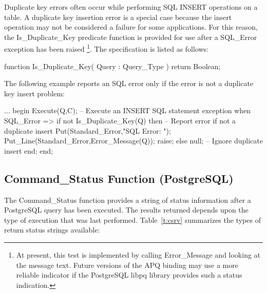 \documentclass[english,letterpaper]{book}
\begin{document}
Duplicate key errors often occur while performing SQL INSERT operations
on a table. A duplicate key insertion error is a special case because
the insert operation may not be considered a failure for some applications.
For this reason, the Is\_Duplicate\_Key predicate function is provided
for use after a SQL\_Error exception has been raised%
\footnote{At present, this test is implemented by calling Error\_Message and
looking at the message text. Future versions of the APQ binding may
use a more reliable indicator if the PostgreSQL libpq library provides
such a status indication.%
}. The specification is listed as follows:

\begin{Code}
function Is_Duplicate_Key(
   Query : Query_Type
) return Boolean;
\end{Code}

The following example reports an SQL error only if the error is not
a duplicate key insert problem:

\begin{Example}
...
begin
   Execute(Q,C);  -- Execute an INSERT SQL statement
exception
   when SQL_Error =>
      if not Is_Duplicate_Key(Q) then
         -- Report error if not a duplicate insert
         Put(Standard_Error,"SQL Error: ");
         Put_Line(Standard_Error,Error_Message(Q));
         raise;
      else
         null; -- Ignore duplicate insert
      end;
end;
\end{Example}

\subsection{Command\_Status Function (PostgreSQL)\label{Command_Status Function}}

The Command\_Status function provides a string of status information
after a PostgreSQL query has been executed. The results returned depends
upon the type of execution that was last performed. Table~\ref{t:csrv}
summarizes the types of return status strings available:%
\end{document}
